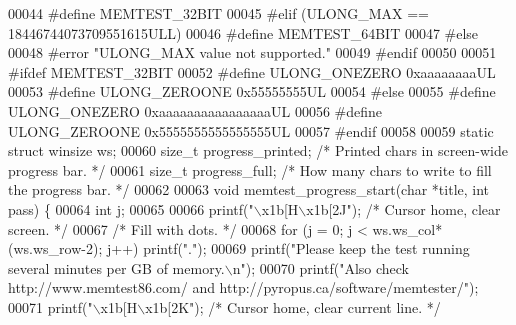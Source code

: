\begin{DoxyCode}
00044 \textcolor{preprocessor}{#}\textcolor{preprocessor}{define} \textcolor{preprocessor}{MEMTEST\_32BIT}
00045 \textcolor{preprocessor}{#}\textcolor{preprocessor}{elif} \textcolor{preprocessor}{(}\textcolor{preprocessor}{ULONG\_MAX} \textcolor{preprocessor}{==} 18446744073709551615ULL\textcolor{preprocessor}{)}
00046 \textcolor{preprocessor}{#}\textcolor{preprocessor}{define} \textcolor{preprocessor}{MEMTEST\_64BIT}
00047 \textcolor{preprocessor}{#}\textcolor{preprocessor}{else}
00048 \textcolor{preprocessor}{#}\textcolor{preprocessor}{error} \textcolor{stringliteral}{"ULONG\_MAX value not supported."}
00049 \textcolor{preprocessor}{#}\textcolor{preprocessor}{endif}
00050 
00051 \textcolor{preprocessor}{#}\textcolor{preprocessor}{ifdef} \textcolor{preprocessor}{MEMTEST\_32BIT}
00052 \textcolor{preprocessor}{#}\textcolor{preprocessor}{define} \textcolor{preprocessor}{ULONG\_ONEZERO} 0xaaaaaaaaUL
00053 \textcolor{preprocessor}{#}\textcolor{preprocessor}{define} \textcolor{preprocessor}{ULONG\_ZEROONE} 0x55555555UL
00054 \textcolor{preprocessor}{#}\textcolor{preprocessor}{else}
00055 \textcolor{preprocessor}{#}\textcolor{preprocessor}{define} \textcolor{preprocessor}{ULONG\_ONEZERO} 0xaaaaaaaaaaaaaaaaUL
00056 \textcolor{preprocessor}{#}\textcolor{preprocessor}{define} \textcolor{preprocessor}{ULONG\_ZEROONE} 0x5555555555555555UL
00057 \textcolor{preprocessor}{#}\textcolor{preprocessor}{endif}
00058 
00059 \textcolor{keyword}{static} \textcolor{keyword}{struct} winsize ws;
00060 size\_t progress\_printed; \textcolor{comment}{/* Printed chars in screen-wide progress bar. */}
00061 size\_t progress\_full; \textcolor{comment}{/* How many chars to write to fill the progress bar. */}
00062 
00063 \textcolor{keywordtype}{void} memtest\_progress\_start(\textcolor{keywordtype}{char} *title, \textcolor{keywordtype}{int} pass) \{
00064     \textcolor{keywordtype}{int} j;
00065 
00066     printf(\textcolor{stringliteral}{"\(\backslash\)x1b[H\(\backslash\)x1b[2J"});    \textcolor{comment}{/* Cursor home, clear screen. */}
00067     \textcolor{comment}{/* Fill with dots. */}
00068     \textcolor{keywordflow}{for} (j = 0; j < ws.ws\_col*(ws.ws\_row-2); j++) printf(\textcolor{stringliteral}{"."});
00069     printf(\textcolor{stringliteral}{"Please keep the test running several minutes per GB of memory.\(\backslash\)n"});
00070     printf(\textcolor{stringliteral}{"Also check http://www.memtest86.com/ and http://pyropus.ca/software/memtester/"});
00071     printf(\textcolor{stringliteral}{"\(\backslash\)x1b[H\(\backslash\)x1b[2K"});          \textcolor{comment}{/* Cursor home, clear current line.  */}

\end{DoxyCode}
